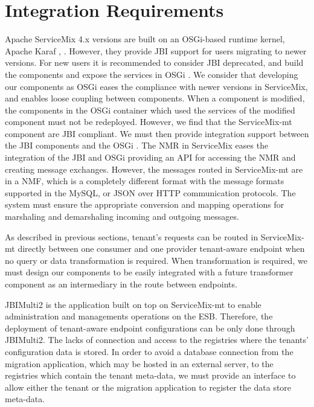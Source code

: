 \section{Integration Requirements}
\label{sec:intrequirements}


Apache ServiceMix 4.x versions are built on an \ac{OSGi}-based runtime kernel, Apache Karaf \cite{ASM}, \cite{Karaf2011}. However, they provide \ac{JBI} support for users migrating to newer versions. For new users it is recommended to consider \ac{JBI} deprecated, and build the components and expose the services in \ac{OSGi} . We consider that developing our components as \ac{OSGi}  eases the compliance with newer versions in ServiceMix, and enables loose coupling between components. When a component is modified, the components in the \ac{OSGi} container which used the services of the modified component must not be redeployed. However, we find that the ServiceMix-mt component are \ac{JBI} compliant. We must then provide integration support between the \ac{JBI} components and the \ac{OSGi} . The \ac{NMR} in ServiceMix eases the integration of the \ac{JBI} and \ac{OSGi} providing an \ac{API} for accessing the \ac{NMR} and creating message exchanges. However, the messages routed in ServiceMix-mt are in a \ac{NMF}, which is a completely different format with the message formats supported in the MySQL, or \ac{JSON} over \ac{HTTP} communication protocols. The system must ensure the appropriate conversion and mapping operations for marshaling and demarshaling incoming and outgoing messages. 

As described in previous sections, tenant's requests can be routed in ServiceMix-mt directly between one consumer and one provider tenant-aware endpoint when no query or data transformation is required. When transformation is required, we must design our components to be easily integrated with a future transformer component as an intermediary in the route between endpoints. 

JBIMulti2 is the application built on top on ServiceMix-mt to enable administration and managements operations on the \ac{ESB}. Therefore, the deployment of tenant-aware endpoint configurations can be only done through JBIMulti2. The  lacks of connection and access to the registries where the tenants' configuration data is stored. In order to avoid a database connection from the migration application, which may be hosted in an external server, to the registries which contain the tenant meta-data, we must provide an interface to allow either the tenant or the migration application to register the data store meta-data.
